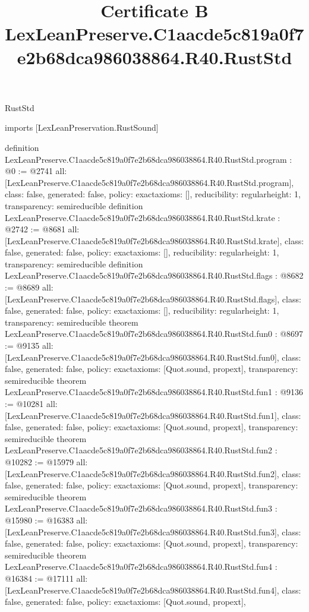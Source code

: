 \begin{lexlean}{RustStd}
\title{Certificate B LexLeanPreserve.C1aacde5c819a0f7e2b68dca986038864.R40.RustStd}
\begin{coremodule}
imports [LexLeanPreservation.RustSound]

definition LexLeanPreserve.C1aacde5c819a0f7e2b68dca986038864.R40.RustStd.program : @0 := @2741 {
  all: [LexLeanPreserve.C1aacde5c819a0f7e2b68dca986038864.R40.RustStd.program],
  class: false,
  generated: false,
  policy: exact{axioms: []},
  reducibility: regular{height: 1},
  transparency: semireducible
}
definition LexLeanPreserve.C1aacde5c819a0f7e2b68dca986038864.R40.RustStd.krate : @2742 := @8681 {
  all: [LexLeanPreserve.C1aacde5c819a0f7e2b68dca986038864.R40.RustStd.krate],
  class: false,
  generated: false,
  policy: exact{axioms: []},
  reducibility: regular{height: 1},
  transparency: semireducible
}
definition LexLeanPreserve.C1aacde5c819a0f7e2b68dca986038864.R40.RustStd.flags : @8682 := @8689 {
  all: [LexLeanPreserve.C1aacde5c819a0f7e2b68dca986038864.R40.RustStd.flags],
  class: false,
  generated: false,
  policy: exact{axioms: []},
  reducibility: regular{height: 1},
  transparency: semireducible
}
theorem LexLeanPreserve.C1aacde5c819a0f7e2b68dca986038864.R40.RustStd.fun0 : @8697 := @9135 {
  all: [LexLeanPreserve.C1aacde5c819a0f7e2b68dca986038864.R40.RustStd.fun0],
  class: false,
  generated: false,
  policy: exact{axioms: [Quot.sound, propext]},
  transparency: semireducible
}
theorem LexLeanPreserve.C1aacde5c819a0f7e2b68dca986038864.R40.RustStd.fun1 : @9136 := @10281 {
  all: [LexLeanPreserve.C1aacde5c819a0f7e2b68dca986038864.R40.RustStd.fun1],
  class: false,
  generated: false,
  policy: exact{axioms: [Quot.sound, propext]},
  transparency: semireducible
}
theorem LexLeanPreserve.C1aacde5c819a0f7e2b68dca986038864.R40.RustStd.fun2 : @10282 := @15979 {
  all: [LexLeanPreserve.C1aacde5c819a0f7e2b68dca986038864.R40.RustStd.fun2],
  class: false,
  generated: false,
  policy: exact{axioms: [Quot.sound, propext]},
  transparency: semireducible
}
theorem LexLeanPreserve.C1aacde5c819a0f7e2b68dca986038864.R40.RustStd.fun3 : @15980 := @16383 {
  all: [LexLeanPreserve.C1aacde5c819a0f7e2b68dca986038864.R40.RustStd.fun3],
  class: false,
  generated: false,
  policy: exact{axioms: [Quot.sound, propext]},
  transparency: semireducible
}
theorem LexLeanPreserve.C1aacde5c819a0f7e2b68dca986038864.R40.RustStd.fun4 : @16384 := @17111 {
  all: [LexLeanPreserve.C1aacde5c819a0f7e2b68dca986038864.R40.RustStd.fun4],
  class: false,
  generated: false,
  policy: exact{axioms: [Quot.sound, propext]},
}
\end{coremodule}
\end{lexlean}
